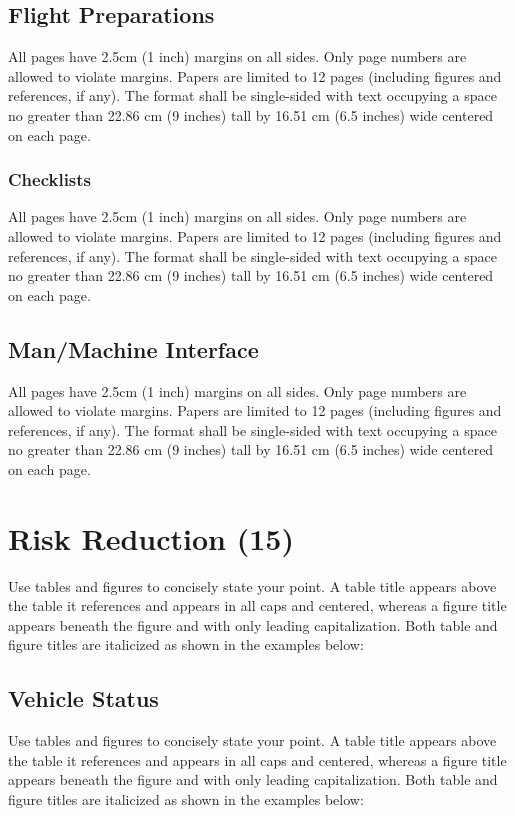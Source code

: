 \documentclass[12pt, letterpaper]{article}
\begin{document}
\subsection{Flight Preparations}
All pages have 2.5cm (1 inch) margins on all sides. Only page numbers are allowed to violate margins. Papers are limited to 12 pages (including figures and references, if any). The format shall be single-sided with text occupying a space no greater than 22.86 cm (9 inches) tall by 16.51 cm (6.5 inches) wide centered on each page.

\subsubsection{Checklists}
All pages have 2.5cm (1 inch) margins on all sides. Only page numbers are allowed to violate margins. Papers are limited to 12 pages (including figures and references, if any). The format shall be single-sided with text occupying a space no greater than 22.86 cm (9 inches) tall by 16.51 cm (6.5 inches) wide centered on each page.

\subsection{Man/Machine Interface}
All pages have 2.5cm (1 inch) margins on all sides. Only page numbers are allowed to violate margins. Papers are limited to 12 pages (including figures and references, if any). The format shall be single-sided with text occupying a space no greater than 22.86 cm (9 inches) tall by 16.51 cm (6.5 inches) wide centered on each page.


\section{Risk Reduction (15)}
Use tables and figures to concisely state your point. A table title appears above the table it references and appears in all caps and centered, whereas a figure title appears beneath the figure and with only leading capitalization. Both table and figure titles are italicized as shown in the examples below:

\subsection{Vehicle Status}
Use tables and figures to concisely state your point. A table title appears above the table it references and appears in all caps and centered, whereas a figure title appears beneath the figure and with only leading capitalization. Both table and figure titles are italicized as shown in the examples below:
\end{document}
